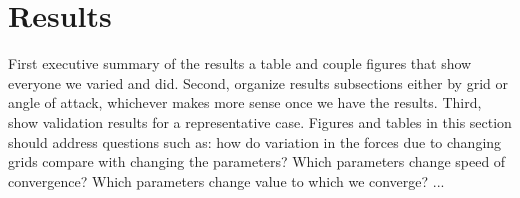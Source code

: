 
\section{Results}
First executive summary of the results a table and couple figures that show everyone we varied and did.
Second, organize results subsections either by grid or angle of attack, whichever makes more sense once we have the results.
Third, show validation results for a representative case.
Figures and tables in this section should address questions such as: how do variation in the forces due to changing grids compare with changing the parameters? Which parameters change speed of convergence? Which parameters change value to which we converge? ...



